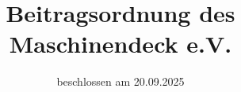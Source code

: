 \documentclass[parskip=half]{scrartcl}
\begin{document}
\newcommand{\associationName}{Maschinendeck} %
\newcommand{\issuedOnDate}{20.09.2025}        %

\newcommand{\membershipFeeOld}{15 \EUR}
\newcommand{\membershipFeeTier}{15 \EUR}         %
\newcommand{\membershipFeeTierOne}{5 \EUR{}}     %
\newcommand{\membershipFeeTierTwo}{15 \EUR{}}    %
\newcommand{\membershipFeeTierThree}{25 \EUR{}}  %

\newcommand{\admissionFee}{10 \EUR{}}        %

\newcommand{\reminderFee}{5 \EUR{}}          %

\newcommand{\contactMail}{office@maschinendeck.org} %


\title{Beitragsordnung des \associationName{} e.V.}
\subtitle{beschlossen am \issuedOnDate{}}
\author{} 
\date{} 
\maketitle
 
\tableofcontents
\newpage
\end{document}
